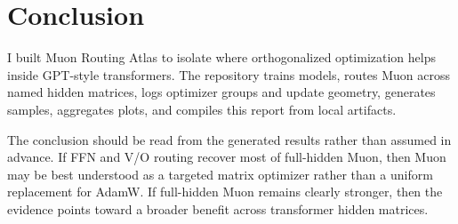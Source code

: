 \section{Conclusion}

I built Muon Routing Atlas to isolate where orthogonalized optimization helps inside GPT-style transformers. The repository trains models, routes Muon across named hidden matrices, logs optimizer groups and update geometry, generates samples, aggregates plots, and compiles this report from local artifacts.

The conclusion should be read from the generated results rather than assumed in advance. If FFN and V/O routing recover most of full-hidden Muon, then Muon may be best understood as a targeted matrix optimizer rather than a uniform replacement for AdamW. If full-hidden Muon remains clearly stronger, then the evidence points toward a broader benefit across transformer hidden matrices.
